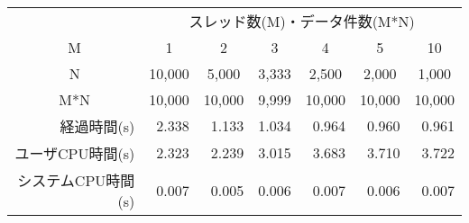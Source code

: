 \documentclass[dvipdfmx]{standalone}
\begin{document}
\tt\footnotesize
\begin{tabular}{r | r r r r r r}
\multicolumn{1}{c}{}&\multicolumn{6}{c}{スレッド数(M)・データ件数(M*N)}\\
\multicolumn{1}{c|}{M}&\multicolumn{1}{c}{1}&\multicolumn{1}{c}{2}&
\multicolumn{1}{c}{3}&\multicolumn{1}{c}{4}&\multicolumn{1}{c}{5}&
\multicolumn{1}{c}{10}\\
\multicolumn{1}{c|}{N}&\multicolumn{1}{c}{10,000}&\multicolumn{1}{c}{5,000}&
\multicolumn{1}{c}{3,333}&\multicolumn{1}{c}{2,500}&\multicolumn{1}{c}{2,000}&
\multicolumn{1}{c}{1,000}\\
\multicolumn{1}{c|}{M*N}&\multicolumn{1}{c}{10,000}&\multicolumn{1}{c}{10,000}&
\multicolumn{1}{c}{9,999}&\multicolumn{1}{c}{10,000}&
\multicolumn{1}{c}{10,000}&\multicolumn{1}{c}{10,000}\\
\hline
経過時間(s)        & 2.338 & 1.133 & 1.034 & 0.964 & 0.960 & 0.961 \\
ユーザCPU時間(s)   & 2.323 & 2.239 & 3.015 & 3.683 & 3.710 & 3.722 \\
システムCPU時間(s) & 0.007 & 0.005 & 0.006 & 0.007 & 0.006 & 0.007 \\
\end{tabular}~
\end{document}
